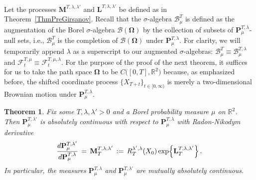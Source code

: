 \documentclass[10pt]{article}
\numberwithin{equation}{section}
\newtheorem{theorem}{Theorem}[section]
\theoremstyle{definition}
\newcommand{\R}{{\mathbb R}}
\begin{document}
Let the processes $\mathbf{M}^{T,\lambda,\lambda'} $ and $\mathbf{L}^{T,\lambda,\lambda'}$ be defined as in Theorem~\ref{ThmPreGirsanov}. Recall that the $\sigma$-algebra
$\mathscr{B}_{\mu}^T$ is defined as the augmentation of  the Borel $\sigma$-algebra $\mathscr{B}(\boldsymbol{\Omega})$ by the collection of subsets of $\mathbf{P}_{\mu}^{T,\lambda}$-null sets, i.e., $\mathscr{B}_{\mu}^T$ is the completion of $\mathscr{B}(\boldsymbol{\Omega})$ under $\mathbf{P}_{\mu}^{T,\lambda}$.  For clarity, we will temporarily append $\lambda$ as a superscript to our augmented $\sigma$-algebras: $\mathscr{B}_{\mu}^{T}\equiv \mathscr{B}_{\mu}^{T,\lambda} $ and $\mathscr{F}_t^{T,\mu}\equiv \mathscr{F}_t^{T,\mu,\lambda} $.    For the purpose of the proof of the next theorem, it suffices for us to take the path space $\boldsymbol{\Omega}$ to be $C\big([0,T],\R^2\big)$ because, as emphasized before, the shifted coordinate process
 $\{X_{T+t}\}_{t\in [0,\infty)}$ is merely a  two-dimensional Brownian motion under $\mathbf{P}_{\mu}^{T,\lambda}$.
\begin{theorem}\label{ThmGirsanov} Fix some $T,\lambda,\lambda'>0$ and a Borel probability measure  $\mu$ on $\R^2$.  
 Then $\mathbf{P}_{\mu}^{T,\lambda'}$ is absolutely continuous with respect to $\mathbf{P}_{\mu}^{T,\lambda}$ with Radon-Nikodym derivative
 \begin{align*}
 \frac{d\mathbf{P}_{\mu}^{T,\lambda'}}{d\mathbf{P}_{\mu}^{T,\lambda}}\,=\, \mathbf{M}^{T,\lambda,\lambda'}_{T}\,:=\,R^{\lambda',\lambda}_T(X_0) \,\textup{exp}\Big\{  \mathbf{L}_{T}^{T,\lambda,\lambda'} \Big\}\,.
 \end{align*}
In particular, the measures $\mathbf{P}_{\mu}^{T,\lambda}$ and  $\mathbf{P}_{\mu}^{T,\lambda'}$ are mutually absolutely continuous.
\end{theorem}
\end{document}

